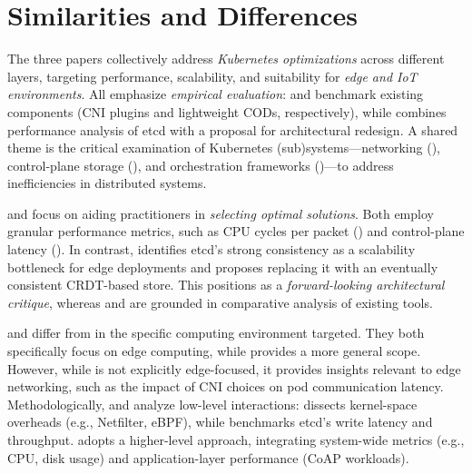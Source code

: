 \section{Similarities and Differences}

The three papers collectively address \emph{Kubernetes optimizations} across different layers, targeting performance, scalability, and suitability for \emph{edge and IoT environments}. All emphasize \emph{empirical evaluation}: \cite{C1} and \cite{C3} benchmark existing components (CNI plugins and lightweight CODs, respectively), while \cite{C2} combines performance analysis of etcd with a proposal for architectural redesign. A shared theme is the critical examination of Kubernetes (sub)systems—networking (\cite{C1}), control-plane storage (\cite{C2}), and orchestration frameworks (\cite{C3})—to address inefficiencies in distributed systems.

\cite{C1} and \cite{C3} focus on aiding practitioners in \emph{selecting optimal solutions}. Both employ granular performance metrics, such as CPU cycles per packet (\cite{C1}) and control-plane latency (\cite{C3}). In contrast, \cite{C2} identifies etcd’s strong consistency as a scalability bottleneck for edge deployments and proposes replacing it with an eventually consistent CRDT-based store. This positions \cite{C2} as a \emph{forward-looking architectural critique}, whereas \cite{C1} and \cite{C3} are grounded in comparative analysis of existing tools.

\cite{C2} and \cite{C3} differ from \cite{C1} in the specific computing environment targeted. They both specifically focus on edge computing, while \cite{C1} provides a more general scope. However, while \cite{C1} is not explicitly edge-focused, it provides insights relevant to edge networking, such as the impact of CNI choices on pod communication latency. Methodologically, \cite{C1} and \cite{C2} analyze low-level interactions: \cite{C1} dissects kernel-space overheads (e.g., Netfilter, eBPF), while \cite{C2} benchmarks etcd’s write latency and throughput. \cite{C3} adopts a higher-level approach, integrating system-wide metrics (e.g., CPU, disk usage) and application-layer performance (CoAP workloads).